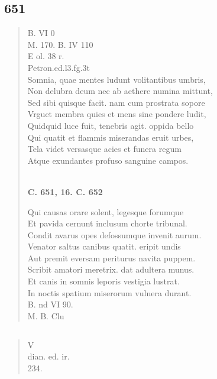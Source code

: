 \documentclass[11pt, a4paper]{report}
\begin{document}
            \subsection*{651}
      \begin{verse}
      B. VI 0 \\ M. 170. B. IV 110 \\ E ol. 38 r. \\ Petron.ed.l3.fg.3t \\ Somnia, quae mentes ludunt volitantibus umbris, \\ Non delubra deum nec ab aethere numina mittunt, \\ Sed sibi quisque facit. nam cum prostrata sopore \\ Vrguet membra quies et mens sine pondere ludit, \\ Quidquid luce fuit, tenebris agit. oppida bello \\ Qui quatit et flammis miserandas eruit urbes, \\ Tela videt versasque acies et funera regum \\ Atque exundantes profuso sanguine campos. \\ 
        ﻿\pagebreak 
    \begin{center} \textbf{C. 651, 16. C. 652} \end{center} \marginpar{[120]} Qui causas orare solent, legesque forumque \\ Et pavida cernunt inclusum chorte tribunal. \\ Condit avarus opes defossumque invenit aurum. \\ Venator saltus canibus quatit. eripit undis \\ Aut premit eversam periturus navita puppem. \\ Scribit amatori meretrix. dat adultera munus. \\ Et canis in somnis leporis vestigia lustrat. \\ In noctis spatium miserorum vulnera durant. \\ B. nd VI 90. \\ M. B. Clu \\ 
      \end{verse}
  
            \subsection*{}
      \begin{verse}
      V \\ dian. ed. ir. \\ 234. \\ 
      \end{verse}
  
\end{document}
